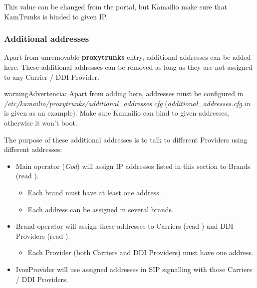 \documentclass[letterpaper,10pt,spanish]{sphinxmanual}
\begin{document}
This value can be changed from the portal, but Kamailio make sure that KamTrunks is binded to given IP.


\subsubsection{Additional addresses}
\label{administration_portal/platform/infrastructure/proxy_trunks:additional-addresses}
Apart from unremovable \textbf{proxytrunks} entry, additional addresses can be added here. These additional addresses can be
removed as long as they are not assigned to any Carrier / DDI Provider.

\begin{notice}{warning}{Advertencia:}
Apart from adding here, addresses must be configured in \emph{/etc/kamailio/proxytrunks/additional\_addresses.cfg}
(\emph{additional\_addresses.cfg.in} is given as an example). Make sure Kamailio can bind to given addresses,
otherwise it won't boot.
\end{notice}

The purpose of these additional addresses is to talk to different Providers using different addresses:
\begin{itemize}
\item {} 
Main operator (\emph{God}) will assign IP addresses listed in this section to Brands (read {\hyperref[administration_portal/platform/brands:brands]{}}).
\begin{itemize}
\item {} 
Each brand must have at least one address.

\item {} 
Each address can be assigned in several brands.

\end{itemize}

\item {} 
Brand operator will assign these addresses to Carriers (read {\hyperref[administration_portal/brand/providers/carriers:carriers]{}}) and DDI Providers (read {\hyperref[administration_portal/brand/providers/ddi_providers:ddi\string-providers]{}}).
\begin{itemize}
\item {} 
Each Provider (both Carriers and DDI Providers) must have one address.

\end{itemize}

\item {} 
IvozProvider will use assigned addresses in SIP signalling with those Carriers / DDI Providers.

\end{itemize}
\end{document}
